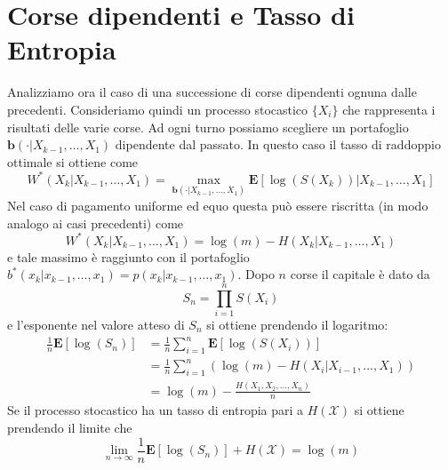 \documentclass[a4paper,11pt]{book}
\theoremstyle{plain}
\theoremstyle{definition}
\theoremstyle{remark}
\begin{document}
\section{Corse dipendenti e Tasso di Entropia}
Analizziamo ora il caso di una successione di corse dipendenti ognuna dalle precedenti. Consideriamo quindi un processo stocastico $\{X_i\}$ che rappresenta i risultati delle varie corse. Ad ogni turno possiamo scegliere un portafoglio $\bm{b}(\cdot|X_{k-1},\ldots, X_1)$ dipendente dal passato.\newline
In questo caso il tasso di raddoppio ottimale si ottiene come
\begin{equation*}
	W^*(X_k|X_{k-1}, \ldots,X_1)
	= \max\limits_{\bm{b}(\cdot|X_{k-1},\ldots,X_1)}\mathbf{E}[\log(S(X_k))|X_{k-1},\ldots, X_1]
\end{equation*}
Nel caso di pagamento uniforme ed equo questa può essere riscritta (in modo analogo ai casi precedenti) come
\begin{equation*}
	W^*(X_k|X_{k-1}, \ldots,X_1) = \log(m) -H(X_k|X_{k-1},\ldots, X_1)
\end{equation*}
e tale massimo è raggiunto con il portafoglio $b^*(x_k|x_{k-1},\ldots,x_1)=p(x_k|x_{k-1},\ldots, x_1)$.\newline
Dopo $n$ corse il capitale è dato da
\begin{equation*}
	S_n = \prod_{i = 1}^{n}S(X_i)
\end{equation*}
e l'esponente nel valore atteso di $S_n$ si ottiene prendendo il logaritmo:
\begin{equation*}
\begin{split}
\frac{1}{n}\mathbf{E}[\log(S_n)] & = \frac{1}{n}\sum_{i = 1}^n{\mathbf{E}[\log(S(X_i))]}\\
& = \frac{1}{n}\sum_{i = 1}^{n}{(\log(m) - H(X_i|X_{i-1},\ldots, X_1))}\\
& = \log(m) -\frac{H(X_1, X_2, \ldots, X_n)}{n}
\end{split}
\end{equation*}
Se il processo stocastico ha un tasso di entropia pari a $H(\mathcal{X})$ si ottiene prendendo il limite che
\begin{equation*}
	\lim\limits_{n\to \infty}\frac{1}{n}\mathbf{E}[\log(S_n)]+H(\mathcal{X}) = \log(m)
\end{equation*}
\end{document}
